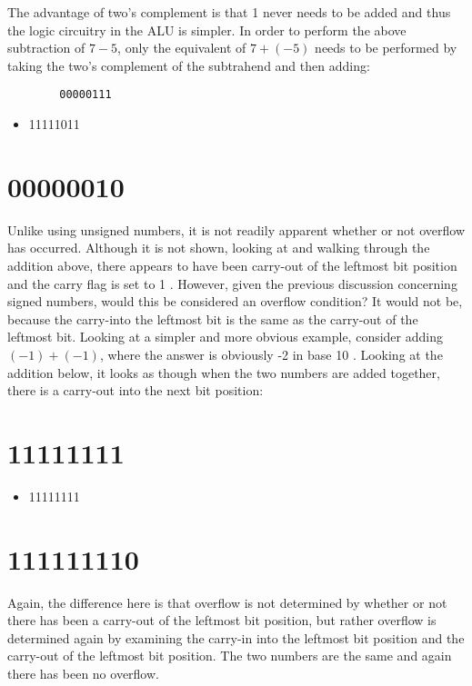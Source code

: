 \documentclass[10pt]{article}
\begin{document}
The advantage of two's complement is that 1 never needs to be added and thus the logic circuitry in the ALU is simpler. In order to perform the above subtraction of $7-5$, only the equivalent of $7+(-5)$ needs to be performed by taking the two's complement of the subtrahend and then adding:

\begin{verbatim}
        00000111
\end{verbatim}

\begin{itemize}
  \item 11111011
\end{itemize}

\section*{00000010}
Unlike using unsigned numbers, it is not readily apparent whether or not overflow has occurred. Although it is not shown, looking at and walking through the addition above, there appears to have been carry-out of the leftmost bit position and the carry flag is set to 1 . However, given the previous discussion concerning signed numbers, would this be considered an overflow condition? It would not be, because the carry-into the leftmost bit is the same as the carry-out of the leftmost bit. Looking at a simpler and more obvious example, consider adding $(-1)+(-1)$, where the answer is obviously -2 in base 10 . Looking at the addition below, it looks as though when the two numbers are added together, there is a carry-out into the next bit position:

\section*{11111111}
\begin{itemize}
  \item 11111111
\end{itemize}

\section*{111111110}
Again, the difference here is that overflow is not determined by whether or not there has been a carry-out of the leftmost bit position, but rather overflow is determined again by examining the carry-in into the leftmost bit position and the carry-out of the leftmost bit position. The two numbers are the same and again there has been no overflow.
\end{document}
